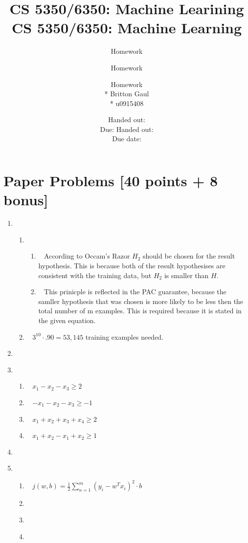 \documentclass[12pt, fullpage,letterpaper]{article}
\title{CS 5350/6350: Machine Learining \semester}
\author{Homework \assignmentId}
\date{Handed out: \releaseDate\\
	Due: \dueDate}
\title{CS 5350/6350: Machine Learning \semester}
\author{Homework \assignmentId}
\date{Handed out: \releaseDate\\
  Due date: \dueDate}
\author{Homework \assignmentId \\* Britton Gaul \\* u0915408}
\begin{document}
\maketitle




\section{Paper Problems [40 points + 8 bonus]}
\begin{enumerate}
\item~

\begin{enumerate}
	\item~
	\begin{enumerate}
		\item~
		\newline According to Occam's Razor $H_2$ should be chosen for the result hypothesis. This is because both of the result hypothesises are consistent with the training data, but $H_2$ is smaller than $H$.
		\item~
		\newline This prinicple is reflected in the PAC guarantee, because the samller hypothesis that was chosen is more likely to be less then the total number of m examples. This is required because it is stated in the given equation. 
	\end{enumerate}
	\item~
	\newline $3^{10} \cdot .90 = 53,145$ training examples needed. 
\end{enumerate}

\item~

\item~
	\begin{enumerate}
		\item~ 
		\newline $x_1 - x_2-x_3 \geq 2 $
		\item~
		\newline $-x_1-x_2-x_3 \geq -1$
		\item~
		\newline $x_1+x_2+x_3+x_4 \geq 2$
		\item ~
		\newline $x_1+x_2-x_1+x_2 \geq 1$
	\end{enumerate}
		
	
	\item

\item~  

\begin{enumerate}
	\item~
	\newline $j(w, b)=\frac{1}{2} \sum_{n=1}^{m} (y_i - w^Tx_i)^2 \cdot b$ 
	\item~
	\item~
	\item~  
\end{enumerate}
\end{enumerate}
\end{document}
